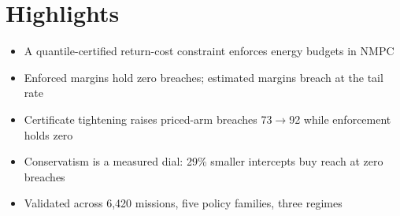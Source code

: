\documentclass{article}
\begin{document}
\section*{Highlights}
\begin{itemize}
\item A quantile-certified return-cost constraint enforces energy budgets in NMPC
\item Enforced margins hold zero breaches; estimated margins breach at the tail rate
\item Certificate tightening raises priced-arm breaches 73$\to$92 while enforcement holds zero
\item Conservatism is a measured dial: 29\% smaller intercepts buy reach at zero breaches
\item Validated across 6,420 missions, five policy families, three regimes
\end{itemize}
\end{document}
